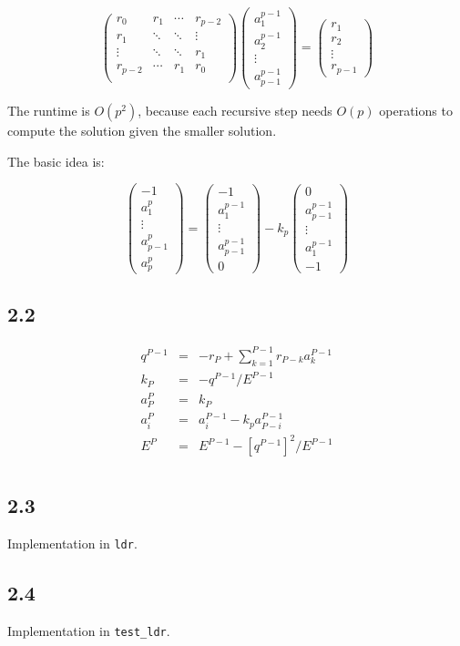 \documentclass[a4paper]{article}
\newcommand{\TT}[1] {\texttt{#1}}
\begin{document}
\[
\begin{pmatrix}
  r_{0} & r_{1} & \cdots & r_{p-2} \\
  r_{1} & \ddots & \ddots & \vdots \\
  \vdots & \ddots & \ddots & r_{1} \\
  r_{p-2} & \cdots & r_{1} & r_{0} \\
\end{pmatrix} \begin{pmatrix}
  a_1^{p-1} \\ a_2^{p-1} \\ \vdots \\ a_{p-1}^{p-1}
\end{pmatrix} = \begin{pmatrix}
  r_1 \\ r_2 \\ \vdots \\ r_{p-1}
\end{pmatrix}
\]

The runtime is $ O(p^2) $, because each recursive step needs $ O(p)
$ operations to compute the solution given the smaller solution.

The basic idea is:

\[
\begin{pmatrix} -1 \\ a_1^p \\ \vdots \\ a_{p-1}^p \\ a_p^p \end{pmatrix} =
\begin{pmatrix} -1 \\ a_1^{p-1} \\ \vdots \\ a_{p-1}^{p-1} \\ 0 \end{pmatrix} - k_p
\begin{pmatrix} 0 \\ a_{p-1}^{p-1} \\ \vdots \\ a_1^{p-1} \\ -1 \end{pmatrix}
\]

\subsection*{2.2}

\begin{eqnarray*}
q^{P-1} &=& -r_{P} + \sum_{k=1}^{P-1} r_{P-k}a_k^{P-1} \\
k_{P} &=& - q^{P-1} / E^{P-1} \\
a_P^P &=& k_{P} \\
a_i^P &=& a_{i}^{P-1} - k_p a_{P-i}^{P-1} \\
E^{P} &=& E^{P-1} - [q^{P-1}]^2 / E^{P-1} \\
\end{eqnarray*}

\subsection*{2.3}

Implementation in \TT{ldr}.

\subsection*{2.4}

Implementation in \TT{test\_ldr}.
\end{document}
